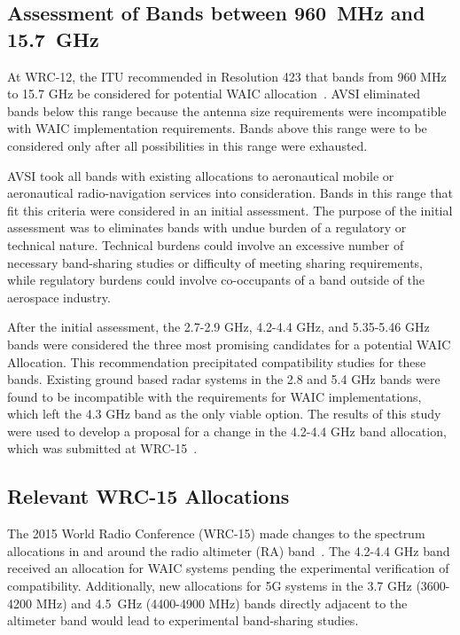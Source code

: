 \subsection{Assessment of Bands between 960~MHz and 15.7~GHz}
At WRC-12, the ITU recommended in Resolution 423 that bands from 960 MHz to 15.7 GHz be considered for potential WAIC allocation~\cite{noauthor_consideration_2014}. AVSI eliminated bands below this range because the antenna size requirements were incompatible with WAIC implementation requirements. Bands above this range were to be considered only after all possibilities in this range were exhausted. 

AVSI took all bands with existing allocations to aeronautical mobile or aeronautical radio-navigation services into consideration. Bands in this range that fit this criteria were considered in an initial assessment. The purpose of the initial assessment was to eliminates bands with undue burden of a regulatory or technical nature. Technical burdens could involve an excessive number of necessary band-sharing studies or difficulty of meeting sharing requirements, while regulatory burdens could involve co-occupants of a band outside of the aerospace industry. 

After the initial assessment, the 2.7-2.9 GHz, 4.2-4.4 GHz, and 5.35-5.46 GHz bands were considered the three most promising candidates for a potential WAIC Allocation. This recommendation precipitated compatibility studies for these bands. Existing ground based radar systems in the 2.8 and 5.4 GHz bands were found to be incompatible with the requirements for WAIC implementations, which left the 4.3 GHz band as the only viable option. The results of this study were used to develop a proposal for a change in the 4.2-4.4 GHz band allocation, which was submitted at WRC-15~\cite{noauthor_consideration_2014}. 

\subsection{Relevant WRC-15 Allocations}
The 2015 World Radio Conference (WRC-15) made changes to the spectrum allocations in and around the radio altimeter (RA) band~\cite{noauthor_final_2015}. The 4.2-4.4 GHz band received an allocation for WAIC systems pending the experimental verification of compatibility. Additionally, new allocations for 5G systems in the 3.7 GHz (3600-4200 MHz) and 4.5~GHz (4400-4900 MHz) bands directly adjacent to the altimeter band would lead to experimental band-sharing studies. 


